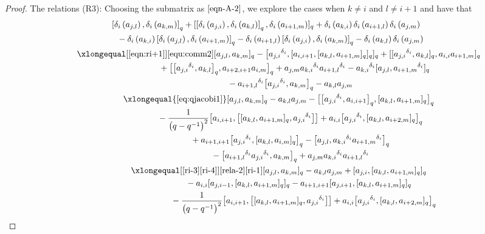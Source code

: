 \documentclass[pdftex]{sigma}
\numberwithin{equation}{section}
\def\lr#1{\left[#1\right]}
\def\lrb#1{\left(#1\right)}
\def\d{\delta}
\def\A{\mathscr{A}}
\begin{document}
\begin{proof}
The relations (R3): Choosing the submatrix \smash{$\A_{j,k,i+1}^{i,l,m}$} as $\eqref{eqn-A-2}$, we explore the cases when $k\neq i$ and $l \neq i+1$ and have that
\begin{gather*}
 \lr{\d_i\lrb{a_{j,l}},\d_i\lrb{a_{k,m}}}_q +[\lr{\d_i\lrb{a_{j,i}},\d_i\lrb{a_{k,l}}}_q, \d_i\lrb{a_{i+1,m}}]_q+\d_i\lrb{a_{k,i}}\d_i\lrb{a_{i+1,l}}\d_i\lrb{a_{j,m}} \\
 \quad {}-\d_i\lrb{a_{k,i}}\lr{\d_i\lrb{a_{j,l}}, \d_i\lrb{a_{i+1,m}}}_q -\d_i\lrb{a_{i+1,l}}\lr{\d_i\lrb{a_{j,i}},\d_i\lrb{a_{k,m}}}_q -\d_i\lrb{a_{k,l}}\d_i\lrb{a_{j,m}}\\
\quad\qquad \xlongequal[\eqref{eqn:ri+1}]{\eqref{equ:comm2}} [a_{j,l},a_{k,m} ]_q - \bigl[{a_{j,i}}^{\d_i}, [a_{i,i+1}, [a_{k,l}, a_{i+1, m} ]_q ]_q ]_q+ [ [{a_{j,i}}^{\d_i}, a_{k,l} ]_q,a_{i,i}a_{i+1,m} ]_q\\
 \qquad\qquad\qquad\ \ {}+ \bigl[ \bigl[{a_{j,i}}^{\d_i},a_{k,l} \bigr]_q, a_{i+2,i+1}a_{i,m} \bigr]_q+a_{j,m}{a_{k,i}}^{\d_i}{a_{i+1,l}}^{\d_i} -{a_{k,i}}^{\d_i} [a_{j,l},{a_{i+1,m}}^{\d_i} ]_q \\
\quad\qquad\qquad \ \ {}-{a_{i+1,l}}^{\d_i} \bigl[{a_{j,i}}^{\d_i},a_{k,m} \bigr]_q -a_{k,l}a_{j,m} \\
\quad\qquad \xlongequal{\eqref{eq:qjacobi1}} [a_{j,l},a_{k,m} ]_q-a_{k,l}a_{j,m} - \bigl[ \bigl[{a_{j,i}}^{\d_i},a_{i,i+1} \bigr]_q, [a_{k,l},a_{i+1,m} ]_q \bigr]_q\\
\quad\qquad\qquad \ \ {}-\frac{1}{\bigl(q-q^{-1}\bigr)^2} \bigl[a_{i,i+1}, \bigl[ [a_{k,l},a_{i+1,m} ]_q,{a_{j,i}}^{\d_i} \bigr] \bigr] +a_{i,i} \bigl[{a_{j,i}}^{\d_i}, [a_{k,l},a_{i+2,m} ]_q \bigr]_q\\
\quad\qquad\qquad \ \ {}+a_{i+1,i+1} \bigl[{a_{j,i}}^{\d_i}, [a_{k,l},a_{i,m} ]_q \bigr]_q - \bigl[a_{j,l},{a_{k,i}}^{\d_i}{a_{i+1,m}}^{\d_i} \bigr]_q\\
 \quad\qquad\qquad\ \ {}- \bigl[{a_{i+1,l}}^{\d_i} {a_{j,i}}^{\d_i},a_{k,m} \bigr]_q +a_{j,m}{a_{k,i}}^{\d_i}{a_{i+1,l}}^{\d_i} \\
\quad\qquad \xlongequal[\substack{{\eqref{ri-3}\eqref{ri-4}}}] {\substack{{\eqref{rela-2}\eqref{ri-1}}}} [a_{j,l},a_{k,m} ]_q-a_{k,l}a_{j,m} + [a_{j,i}, [a_{k,l},a_{i+1,m} ]_q ]_q \\
\quad\qquad\qquad \qquad\ \ {}-a_{i,i} [a_{j,i-1}, [a_{k,l},a_{i+1,m} ]_q ]_q -a_{i+1,i+1} [a_{j,i+1}, [a_{k,l},a_{i+1,m} ]_q ]_q\\
\qquad\qquad\qquad \qquad\ \ {}-\frac{1}{\bigl(q-q^{-1}\bigr)^2} \bigl[a_{i,i+1}, \bigl[ [a_{k,l},a_{i+1,m} ]_q, {a_{j,i}}^{\d_i} \bigr] \bigr]+a_{i,i} \bigl[{a_{j,i}}^{\d_i}, [a_{k,l},a_{i+2,m} ]_q \bigr]_q \!\\

\end{gather*}
\end{proof}
\end{document}
